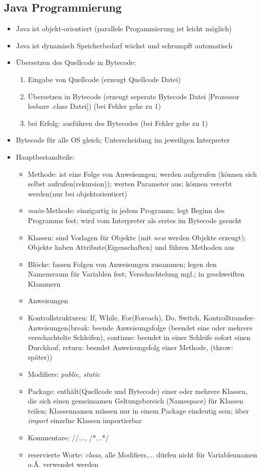 \documentclass[12pt,landscape]{article}
\begin{document}
\begin{multicols}{3}
\subsection{Java Programmierung}
\begin{itemize}
\item Java ist objekt-orientiert (parallele Progammierung ist leicht möglich)
\item Java ist dynamisch Speicherbedarf wächst und schrumpft automatisch
\item Übersetzen des Quellcode in Bytecode:
\begin{enumerate}
    \item Eingabe von Quellcode (erzeugt Quellcode Datei)
    \item Übersetzen in Bytecode (erzeugt seperate Bytecode Datei [Prozessor lesbare .class Datei]) (bei Fehler gehe zu 1)
    \item bei Erfolg: ausführen des Bytecodes (bei Fehler gehe zu 1) 
\end{enumerate}
\item Bytecode für alle OS gleich; Unterscheidung im jeweiligen Interpreter 
\item Hauptbestandteile: 
\begin{itemize}
    \item Methode: ist eine Folge von Anweisungen; werden aufgerufen (können sich selbst aufrufen(rekursion)); werten Parameter aus; können vererbt werden(nur bei objektorientiert)
    \item \textit{main}-Methode: einzigartig in jedem Programm; legt Beginn des Programms fest; wird vom Interpreter als erstes im Bytecode gesucht 
    \item Klassen: sind Vorlagen für Objekte (mit \textit{new} werden Objekte erzeugt); Objekte haben Attribute(Eigenschaften) und führen Methoden aus
    \item Blöcke: fassen Folgen von Anweisungen zusammen; legen den Namensraum für Variablen fest; Verschachtelung mgl.; in geschweiften Klammern
    \item Anweisungen
    \item Kontrollstrukturen: If, While, For(Foreach), Do, Switch, Kontrolltransfer-Anweisungen(break: beende Anweisungsfolge (beendet eine oder mehrere verschachtelte Schleifen), continue: beendet in einer Schleife sofort einen Durchlauf, return: beendet Anweisungsfolg einer Methode, (throw: später))
    \item Modifiers: \textit{public, static}
    \item Package: enthält(Quellcode und Bytecode) einer oder mehrere Klassen, die sich einen gemeinsamen Geltungsbereich (Namespace) für Klassen teilen; Klassennamen müssen nur in einem Package eindeutig sein; über \textit{import} einzelne Klassen importierbar 
    \item Kommentare: //..., /*...*/
    \item reservierte Worte: \textit{claas}, alle Modifiers,... dürfen nicht für Variablennamen o.Ä. verwendet werden
\end{itemize}

\end{itemize}
\end{multicols}
\end{document}
